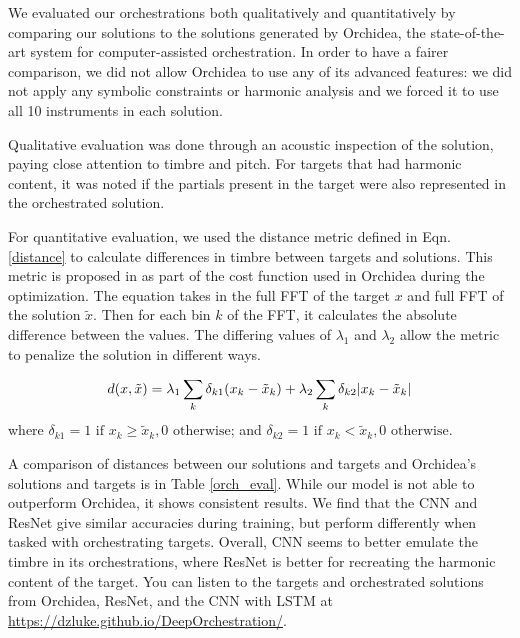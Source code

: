 \documentclass[runningheads,a4paper]{llncs}
\begin{document}
We evaluated our orchestrations both qualitatively and quantitatively by comparing our solutions to the solutions generated by Orchidea, the state-of-the-art system for computer-assisted orchestration. 
In order to have a fairer comparison, we did not allow Orchidea to use any of its advanced features: we did not apply any symbolic constraints or harmonic analysis and we forced it to use all 10 instruments in each solution.


Qualitative evaluation was done through an acoustic inspection of the solution, paying close attention to timbre and pitch. For targets that had harmonic content, it was noted if the partials present in the target were also represented in the orchestrated solution.

For quantitative evaluation, we used the distance metric defined in Eqn. \ref{distance} to calculate differences in timbre between targets and solutions. This metric is proposed in \cite{Cella2020} as part of the cost function used in Orchidea during the optimization. The equation takes in the full FFT of the target $x$ and full FFT of the solution $\tilde{x}$. Then for each bin $k$ of the FFT, it calculates the absolute difference between the values. The differing values of $\lambda_1$ and $\lambda_2$ allow the metric to penalize the solution in different ways.

\begin{equation}\label{distance}
d(x, \tilde{x}) =\lambda_1 \sum_k \delta_{k1}(x_k - \tilde{x}_k) + \lambda_2 \sum_k \delta_{k2}|x_k - \tilde{x	}_k| \\
\end{equation}
where $\delta_{k1} = 1 \text{  if  } x_k \ge \tilde{x}_k, 0 \text{  otherwise}$; and $\delta_{k2} = 1 \text{  if  } x_k < \tilde{x}_k, 0 \text{  otherwise}$.

A comparison of distances between our solutions and targets and Orchidea's solutions and targets is in Table \ref{orch_eval}. While our model is not able to outperform Orchidea, it shows consistent results. We find that the CNN and ResNet give similar accuracies during training, but perform differently when tasked with orchestrating targets. Overall, CNN seems to better emulate the timbre in its orchestrations, where ResNet is better for recreating the harmonic content of the target. You can listen to the targets and orchestrated solutions from Orchidea, ResNet, and the CNN with LSTM at \url{https://dzluke.github.io/DeepOrchestration/}.
\end{document}
